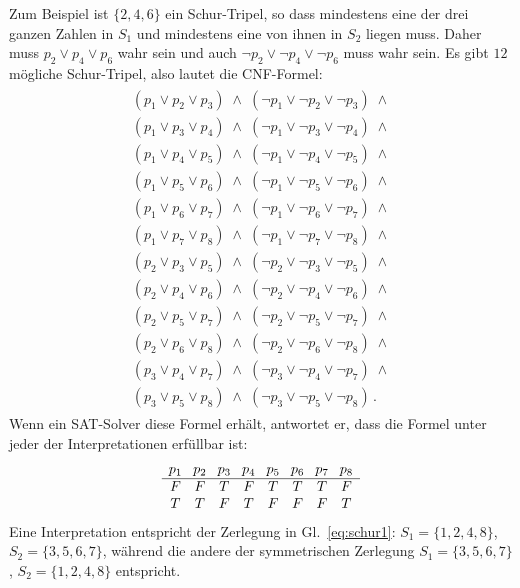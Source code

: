 Zum Beispiel ist $\{2,4,6\}$ ein Schur-Tripel, so dass mindestens eine der drei ganzen Zahlen in $S_1$ und mindestens eine von ihnen in $S_2$ liegen muss. Daher muss $p_2 \vee p_4 \vee p_6$ wahr sein und auch $\neg p_2 \vee \neg p_4 \vee \neg p_6$ muss wahr sein. Es gibt $12$ mögliche Schur-Tripel, also lautet die CNF-Formel:
\begin{align}
\begin{array}{l}
(p_1 \vee p_2 \vee p_3) \;\wedge\; (\neg p_1 \vee \neg p_2 \vee \neg p_3) \;\wedge \\
(p_1 \vee p_3 \vee p_4) \;\wedge\; (\neg p_1 \vee \neg p_3 \vee \neg p_4) \;\wedge \\
(p_1 \vee p_4 \vee p_5) \;\wedge\; (\neg p_1 \vee \neg p_4 \vee \neg p_5) \;\wedge \\
(p_1 \vee p_5 \vee p_6) \;\wedge\; (\neg p_1 \vee \neg p_5 \vee \neg p_6) \;\wedge \\
(p_1 \vee p_6 \vee p_7) \;\wedge\; (\neg p_1 \vee \neg p_6 \vee \neg p_7) \;\wedge \\
(p_1 \vee p_7 \vee p_8) \;\wedge\; (\neg p_1 \vee \neg p_7 \vee \neg p_8) \;\wedge \\
(p_2 \vee p_3 \vee p_5) \;\wedge\; (\neg p_2 \vee \neg p_3 \vee \neg p_5) \;\wedge \\
(p_2 \vee p_4 \vee p_6) \;\wedge\; (\neg p_2 \vee \neg p_4 \vee \neg p_6) \;\wedge \\
(p_2 \vee p_5 \vee p_7) \;\wedge\; (\neg p_2 \vee \neg p_5 \vee \neg p_7) \;\wedge \\
(p_2 \vee p_6 \vee p_8) \;\wedge\; (\neg p_2 \vee \neg p_6 \vee \neg p_8) \;\wedge \\
(p_3 \vee p_4 \vee p_7) \;\wedge\; (\neg p_3 \vee \neg p_4 \vee \neg p_7) \;\wedge \\
(p_3 \vee p_5 \vee p_8) \;\wedge\; (\neg p_3 \vee \neg p_5 \vee \neg p_8)\,.
\end{array}\label{eq.schur2}
\end{align}
Wenn ein SAT-Solver diese Formel erhält, antwortet er, dass die Formel unter jeder der Interpretationen erfüllbar ist:
\[
\begin{array}{c@{\hspace{8pt}}c@{\hspace{8pt}}c@{\hspace{8pt}}c@{\hspace{8pt}}c@{\hspace{8pt}}c@{\hspace{8pt}}c@{\hspace{8pt}}c}
p_1&p_2&p_3&p_4&p_5&p_6&p_7&p_8\\\hline
F&F&T&F&T&T&T&F\\
T&T&F&T&F&F&F&T
\end{array}
\]
Eine Interpretation entspricht der Zerlegung in Gl.~\ref{eq:schur1}: $S_1=\{1,2,4,8\}$, $S_2=\{3,5,6,7\}$, während die andere der symmetrischen Zerlegung $S_1=\{3,5,6,7\}$, $S_2=\{1,2,4,8\}$ entspricht.

